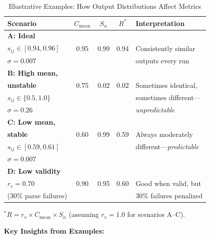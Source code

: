\documentclass{article}
\theoremstyle{plain}
\theoremstyle{definition}
\begin{document}
\begin{table}[h]
\centering
\caption{Illustrative Examples: How Output Distributions Affect Metrics}
\label{tab:metric-examples}
\scriptsize
\begin{tabular}{@{}p{2.8cm}cccl@{}}
\toprule
\textbf{Scenario} & $C_{\text{mean}}$ & $S_\alpha$ & $R^*$ & \textbf{Interpretation} \\
\midrule
\textbf{A: Ideal} & & & & \\
$s_{ij} \in [0.94, 0.96]$ & 0.95 & 0.99 & 0.94 & Consistently similar \\
$\sigma = 0.007$ & & & & outputs every run \\
\midrule
\textbf{B: High mean,} & & & & \\
\textbf{unstable} & 0.75 & 0.02 & 0.02 & Sometimes identical, \\
$s_{ij} \in \{0.5, 1.0\}$ & & & & sometimes different--- \\
$\sigma = 0.26$ & & & & \textit{unpredictable} \\
\midrule
\textbf{C: Low mean,} & & & & \\
\textbf{stable} & 0.60 & 0.99 & 0.59 & Always moderately \\
$s_{ij} \in [0.59, 0.61]$ & & & & different---\textit{predictable} \\
$\sigma = 0.007$ & & & & \\
\midrule
\textbf{D: Low validity} & & & & \\
$r_v = 0.70$ & 0.90 & 0.95 & 0.60 & Good when valid, but \\
(30\% parse failures) & & & & 30\% failures penalized \\
\bottomrule
\end{tabular}

\vspace{0.3em}
\raggedright\scriptsize $^*R = r_v \times C_{\text{mean}} \times S_\alpha$ (assuming $r_v = 1.0$ for scenarios A--C).
\end{table}

\textbf{Key Insights from Examples:}
\end{document}
